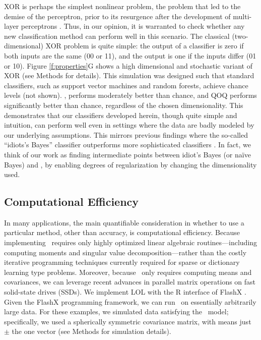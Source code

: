 \documentclass[10pt]{article}
\begin{document}
  XOR is perhaps the simplest nonlinear problem, the problem that led to the demise of the perceptron, prior to its resurgence after the development of multi-layer perceptrons \cite{Bishop2006a}.  Thus, in our opinion, it is warranted to check whether any new classification method can perform well in this scenario.  The classical (two-dimensional) XOR problem is quite simple: the output of a classifier is zero if both inputs are the same (00 or 11), and the output is one if the inputs differ (01 or 10).  Figure \ref{f:properties}G shows a high dimensional and stochastic variant of XOR (see Methods for details).  This simulation was designed such that standard classifiers, such as support vector machines and random forests, achieve chance levels (not shown).  \Lol, performs moderately better than chance, and QOQ performs significantly better than chance, regardless of the chosen dimensionality.  This demonstrates that our classifiers developed herein, though quite simple and intuition, can perform well even in settings where the data are badly modeled by our underlying assumptions.  This mirrors previous findings where the so-called ``idiots's Bayes'' classifier outperforms more sophisticated classifiers \cite{Bickel2004a}.  In fact, we think of our work as finding intermediate points between idiot's Bayes (or na\"ive Bayes) and \Fld, by enabling degrees of regularization by changing the dimensionality used.


\subsection*{Computational Efficiency}

In many applications, the main quantifiable consideration in whether to use a particular method, other than accuracy, is computational efficiency.  Because implementing \Lol~requires only highly optimized linear algebraic routines---including computing moments and singular value decomposition---rather than the costly iterative programming techniques currently required for sparse or dictionary learning type problems.  Moreover, because \Lol~only requires computing means and covariances, we can leverage recent advances in parallel matrix operations \cite{FlashMatrix} on fast solid-state drives (SSDs). We implement LOL with the R interface of FlashX \cite{FlashGraph, FlashMatrix, FlashEigen}.
Given the FlashX programming framework, we can run \Lol~on essentially arbitrarily large data.  For these examples, we simulated data satisfying the \Lda~model; specifically, we used a spherically symmetric covariance matrix, with means just $\pm$ the one vector (see Methods for simulation details).
\end{document}
